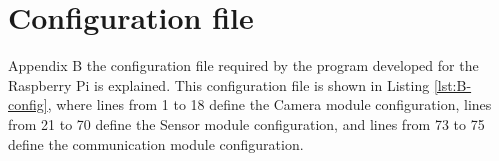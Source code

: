 \chapter{Configuration file}
\label{chap:config_file}

 Appendix B the configuration file required by the program developed for the Raspberry Pi is explained. This configuration file is shown in Listing \ref{lst:B-config}, where lines from 1 to 18 define the Camera module configuration, lines from  21 to 70 define the Sensor module configuration, and lines from 73 to 75 define the communication module configuration.


